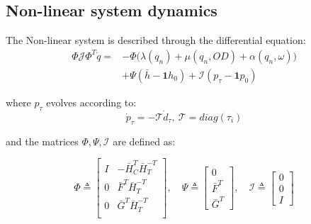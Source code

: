 \subsection{Non-linear system dynamics}\label{sec:Non-linear}
The Non-linear system is described through the differential equation:
\begin{equation}\label{eq:NonLinearModelWithTank}
	\begin{split}
			\Phi\mathcal{J}\Phi^T \dot{q} = &-\Phi\Big(\lambda(q_n)+\mu(q_n,OD)+\alpha(q_n,\omega)\Big)\\ 
			&+ \Psi(\bar{h}-\mathbf{1}h_0) + \mathcal{I}(p_{\tau}-\mathbf{1}p_0)
	\end{split}
\end{equation}

where $p_{\tau}$ evolves according to:
\begin{equation}\label{eq:TankDynamics}
	\dot{p}_{\tau} = - \mathcal{T} \dot{d}_{\tau}, \ \mathcal{T} = diag(\tau_i)
\end{equation}

and the matrices $\Phi, \Psi, \mathcal{I}$ are defined as:

\begin{equation}\label{eq:NonLinearModelMatrices}
	\Phi \triangleq 
	\begin{bmatrix} 
		I & -\bar{H}_C^T\bar{H}_T^{-T} \\ 0 & \bar{F}^T\bar{H}_T^{-T} \\ 0  & \bar{G}^T\bar{H}_T^{-T} \\ 
	\end{bmatrix}
	, \quad
	\Psi \triangleq
	\begin{bmatrix}
		0 \\ \bar{F}^T \\ \bar{G}^T
	\end{bmatrix}
	, \quad
	\mathcal{I} \triangleq
	\begin{bmatrix}
		0 \\ 0 \\ I
	\end{bmatrix}
\end{equation}